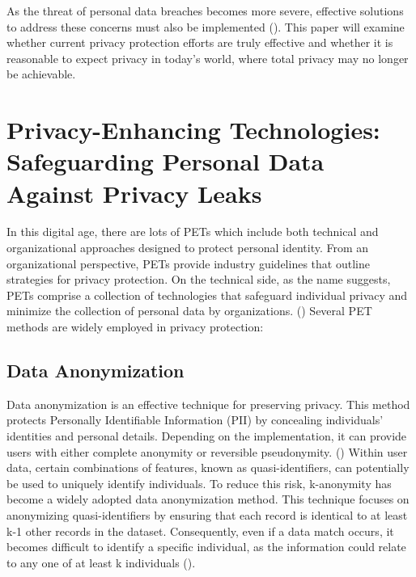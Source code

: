 \documentclass[a4paper,12pt]{article}
\newcommand{\sectionpage}[1]{
  \newpage
  \section{#1}
  \doublespacing
  \singlespacing
}
\begin{document}
As the threat of personal data breaches becomes more severe, effective solutions to address these concerns must also be implemented (\cite{kan2023differential}). This paper will examine whether current privacy protection efforts are truly effective and whether it is reasonable to expect privacy in today's world, where total privacy may no longer be achievable.


\sectionpage{Privacy-Enhancing Technologies: Safeguarding Personal Data Against Privacy Leaks}
\onehalfspacing
In this digital age, there are lots of PETs which include both technical and organizational approaches designed to protect personal identity. From an organizational perspective, PETs provide industry guidelines that outline strategies for privacy protection. On the technical side, as the name suggests, PETs comprise a collection of technologies that safeguard individual privacy and minimize the collection of personal data by organizations. (\cite{tavani2001privacy}) Several PET methods are widely employed in privacy protection:
 
\subsection{Data Anonymization}

Data anonymization is an effective technique for preserving privacy. This method protects Personally Identifiable Information (PII) by concealing individuals' identities and personal details. Depending on the implementation, it can provide users with either complete anonymity or reversible pseudonymity. (\cite{shen2011privacy}) Within user data, certain combinations of features, known as quasi-identifiers, can potentially be used to uniquely identify individuals. To reduce this risk, k-anonymity has become a widely adopted data anonymization method. This technique focuses on anonymizing quasi-identifiers by ensuring that each record is identical to at least k-1 other records in the dataset. Consequently, even if a data match occurs, it becomes difficult to identify a specific individual, as the information could relate to any one of at least k individuals (\cite{murthy2019anonymization}).
\end{document}
